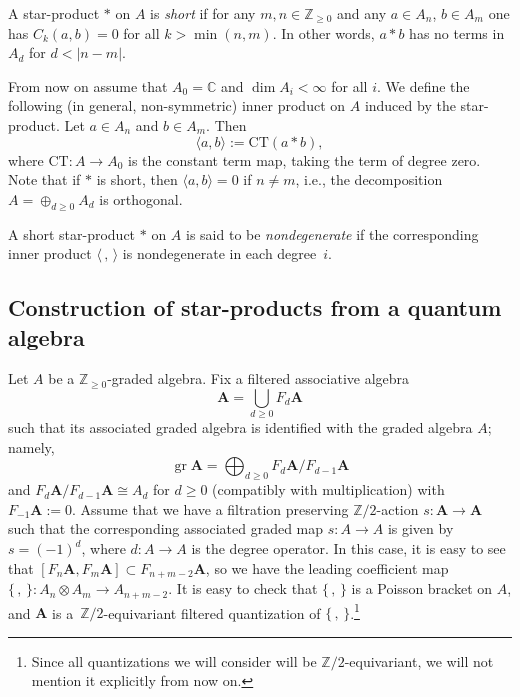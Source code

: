 \documentclass[pdftex]{sigma}
\numberwithin{equation}{section}
\begin{document}
\begin{Definition} A star-product $*$ on $A$ is \emph{short} if
for any $m,n\in {\mathbb Z}_{\ge 0}$ and any $a \in A_n$, $b \in A_m$ one has $C_k(a,b) = 0$ for all $k > \min(n,m)$. In other words, $a * b$ has no terms in $A_d$ for $d < |n - m|$.
\end{Definition}

From now on assume that $A_0={\mathbb C}$ and $\dim A_i<\infty$ for all $i$. We define the following (in general, non-symmetric) inner product on $A$ induced by the star-product. Let $a \in A_n$ and $b \in A_m$. Then
\[
\langle a, b \rangle := \text{CT}(a * b),
\]
where $\text{CT}\colon A \to A_0$ is the constant term map, taking the term of degree zero. Note that if $*$ is short, then $\langle a, b \rangle = 0$ if $n \neq m$, i.e., the decomposition $A=\oplus_{d\ge 0}A_d$ is orthogonal.

\begin{Definition} A short star-product $*$ on $A$ is said to be {\it nondegenerate} if the corresponding inner product $\langle \,,\,\rangle$ is nondegenerate in each degree~$i$.
\end{Definition}

\subsection{Construction of star-products from a quantum algebra}\label{constru} Let $A$ be a ${\mathbb Z}_{\ge 0}$-graded algebra. Fix a filtered associative algebra
\[
{{\mathbf A}} = \bigcup_{d \geq 0} F_d{{\mathbf A}}
\]
such that its associated graded algebra is identified with the graded algebra $A$; namely,
\[
\operatorname{gr}{{\mathbf A}} = \bigoplus_{d \geq 0} F_{d}{{\mathbf A}}/F_{d-1}{{\mathbf A}}
\]
and $F_{d}{{\mathbf A}}/F_{d-1}{{\mathbf A}} \cong A_d$ for $d \geq 0$ (compatibly with multiplication) with $F_{-1}{{\mathbf A}} := 0$.
Assume that we have a filtration preserving ${\mathbb Z}/2$-action $s\colon {{\mathbf A}}\to {{\mathbf A}}$ such that the corresponding associated graded map $s\colon A\to A$ is given by $s=(-1)^d$, where $d\colon A\to A$ is the degree operator. In this case, it is easy to see that $[F_n{{\mathbf A}},F_m{{\mathbf A}}]\subset F_{n+m-2}{{\mathbf A}}$, so we have the leading coefficient map $\lbrace\,,\,\rbrace\colon A_n\otimes A_m\to A_{n+m-2}$. It is easy to check that $\lbrace\,,\,\rbrace$ is a Poisson bracket on $A$, and ${{\mathbf A}}$ is a~${\mathbb Z}/2$-equivariant filtered quantization of $\lbrace\,,\,\rbrace$.\footnote{Since all quantizations we will consider will be ${\mathbb Z}/2$-equivariant, we will not mention it explicitly from now on.}
\end{document}
